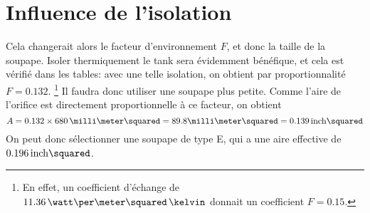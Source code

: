 \section{Influence de l'isolation}
Cela changerait alors le facteur d'environnement $F$,
et donc la taille de la soupape.
Isoler thermiquement le tank sera évidemment bénéfique,
et cela est vérifié dans les tables:
avec une telle isolation, on obtient par proportionnalité $F=0.132$.%
\footnote{En effet, un coefficient d'échange de
$11.36\,\watt\per\meter\squared\,\kelvin$
donnait un coefficient $F=0.15$.}
Il faudra donc utiliser une soupape plus petite.
Comme l'aire de l'orifice est directement proportionnelle à ce facteur, on obtient
\begin{equation*}
    A = 0.132 \times 680\,\milli\meter\squared
    = 89.8\milli\meter\squared = 0.139\,\inch\squared
\end{equation*}
On peut donc sélectionner une soupape de type E,
qui a une aire effective de $0.196\,\inch\squared$.
